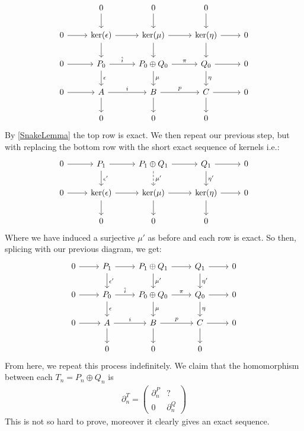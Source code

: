 \documentclass[12pt]{book}
\theoremstyle{definition}
\begin{document}
\[
\begin{tikzcd}
    & 0 \arrow[d]& 0 \arrow[d] & 0 \arrow[d]\\
    0 \arrow[r] & \ker (\epsilon) \arrow[d] \arrow[r] & \ker (\mu) \arrow[d] \arrow[r] & \ker (\eta) \arrow[r] \arrow[d]  & 0 \\
    0 \arrow[r] & P_0 \arrow[d, "\epsilon"] \arrow[r, "\hat{i}"] & P_0 \oplus Q_0 \arrow[d,  "\mu"] \arrow[r, "\pi"] & Q_0 \arrow[r] \arrow[d, "\eta"] & 0 \\
    0 \arrow[r] & A \arrow[d] \arrow[r, "i"] & B \arrow[d] \arrow[r, "p"] & C \arrow[r] \arrow[d] & 0 \\
    & 0 & 0 & 0 
\end{tikzcd}
\]
By \ref{SnakeLemma} the top row is exact. We then repeat our previous step, but with replacing the bottom row with the short exact sequence of kernels i.e.: 
\[
\begin{tikzcd}
    0 \arrow[r] & P_1 \arrow[d, "\epsilon'"] \arrow[r] & P_1 \oplus Q_1 \arrow[d, dashed, "\mu'"] \arrow[r] & Q_1 \arrow[r] \arrow[d, "\eta'"] & 0 \\
    0 \arrow[r] & \ker (\epsilon) \arrow[r] \arrow[d] & \ker (\mu) \arrow[d] \arrow[r] & \ker (\eta) \arrow[r] \arrow[d] & 0\\
    & 0 & 0 & 0 & 
\end{tikzcd}
\]
Where we have induced a surjective $\mu'$ as before and each row is exact. So then, splicing with our previous diagram, we get: 
\[
\begin{tikzcd}
    0 \arrow[r] & P_1 \arrow[d, "\epsilon'"] \arrow[r] & P_1 \oplus Q_1 \arrow[d, "\mu'"] \arrow[r] & Q_1 \arrow[r] \arrow[d, "\eta'"] & 0 \\
    0 \arrow[r] & P_0 \arrow[d, "\epsilon"] \arrow[r, "\hat{i}"] & P_0 \oplus Q_0 \arrow[d,  "\mu"] \arrow[r, "\pi"] & Q_0 \arrow[r] \arrow[d, "\eta"] & 0 \\
    0 \arrow[r] & A \arrow[d] \arrow[r, "i"] & B \arrow[d] \arrow[r, "p"] & C \arrow[r] \arrow[d] & 0 \\
    & 0 & 0 & 0 
\end{tikzcd}
\]
From here, we repeat this process indefinitely. We claim that the homomorphism between each $T_n = P_n \oplus Q_n$ is 
    \begin{align*}
        \partial^T_n = 
        \begin{pmatrix}
            \partial^P_n & ? \\
            0            & \partial^Q_n
        \end{pmatrix} 
    \end{align*}    
This is not so hard to prove, moreover it clearly gives an exact sequence. 
\end{document}
